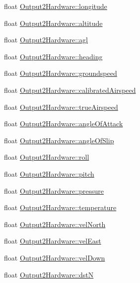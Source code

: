 \begin{DoxyCompactItemize}
float \hyperlink{group___h_i_t_l_plugin_gacf92ed715333315d33a77f42aa1ed71e}{\-Output2\-Hardware\-::longitude}
\item 
float \hyperlink{group___h_i_t_l_plugin_gafbb52a0b15f16cac6f1efbcae3702e96}{\-Output2\-Hardware\-::altitude}
\item 
float \hyperlink{group___h_i_t_l_plugin_ga40e8c62b6079618b6541408ce3dafe0c}{\-Output2\-Hardware\-::agl}
\item 
float \hyperlink{group___h_i_t_l_plugin_ga061c55e7f046212595dae9123b2589d8}{\-Output2\-Hardware\-::heading}
\item 
float \hyperlink{group___h_i_t_l_plugin_ga6cab485f36b93a2e86e248bcc6b240f1}{\-Output2\-Hardware\-::groundspeed}
\item 
float \hyperlink{group___h_i_t_l_plugin_gaa6ec37dae61764737236528ba5a2445c}{\-Output2\-Hardware\-::calibrated\-Airspeed}
\item 
float \hyperlink{group___h_i_t_l_plugin_gaca71e282fd00490c801905254e99ef54}{\-Output2\-Hardware\-::true\-Airspeed}
\item 
float \hyperlink{group___h_i_t_l_plugin_gaa698baa5c5eb08252558e7821e3d48dd}{\-Output2\-Hardware\-::angle\-Of\-Attack}
\item 
float \hyperlink{group___h_i_t_l_plugin_ga03a3c3371749ca83551e6f29e804a205}{\-Output2\-Hardware\-::angle\-Of\-Slip}
\item 
float \hyperlink{group___h_i_t_l_plugin_ga8f2327775c3342e13799a4ed6392f23f}{\-Output2\-Hardware\-::roll}
\item 
float \hyperlink{group___h_i_t_l_plugin_gaf92e2c90046782813af0a2fdd6e48bf4}{\-Output2\-Hardware\-::pitch}
\item 
float \hyperlink{group___h_i_t_l_plugin_ga9c1fdbe8d01c5346b54b71beff806a7e}{\-Output2\-Hardware\-::pressure}
\item 
float \hyperlink{group___h_i_t_l_plugin_ga925c7971d40c91b63e480e5f89096747}{\-Output2\-Hardware\-::temperature}
\item 
float \hyperlink{group___h_i_t_l_plugin_gaa20e34957a2badaea5d07a49ab029182}{\-Output2\-Hardware\-::vel\-North}
\item 
float \hyperlink{group___h_i_t_l_plugin_gae7889fb60f991558b83af5aef685a35f}{\-Output2\-Hardware\-::vel\-East}
\item 
float \hyperlink{group___h_i_t_l_plugin_ga9d5ac871d0c0845dcd9363069268c2d3}{\-Output2\-Hardware\-::vel\-Down}
\item 
float \hyperlink{group___h_i_t_l_plugin_gad276a9a114b2d57a5c4536e9ef0a9a12}{\-Output2\-Hardware\-::dst\-N}

\end{DoxyCompactItemize}
